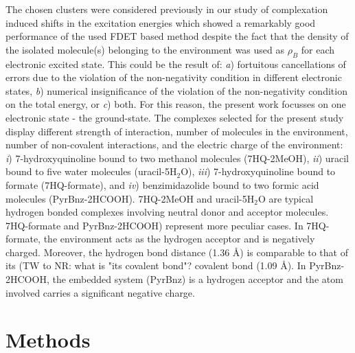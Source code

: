 \documentclass[journal=jctcce,manuscript=article]{achemso}
\begin{document}
The chosen clusters were considered previously in our study of complexation induced shifts in the excitation energies \cite{Ricardi2018} which showed a remarkably good performance of the used FDET based method despite the fact that the density of the isolated molecule(s) belonging to the environment was used as $\rho_B$  for each electronic excited state. This could be the result of: {\it a})  fortuitous cancellations of errors due to the violation of the non-negativity condition in different electronic states, {\it b}) numerical insignificance of the violation of the non-negativity condition on the total energy, or {\it c}) both. 
For this reason, the present work focusses on one electronic state - the ground-state.
The complexes selected for the present study  display different strength of interaction, number of molecules in the environment, number of non-covalent interactions, and the electric charge of the environment:
{\it i})  7-hydroxyquinoline bound to two methanol molecules (7HQ-2MeOH), {\it ii}) uracil bound to five water molecules (uracil-5H$_2$O), {\it iii}) 7-hydroxyquinoline bound to formate (7HQ-formate), and {\it iv}) benzimidazolide bound to two formic acid molecules (PyrBnz-2HCOOH). 
7HQ-2MeOH and  uracil-5H$_2$O are typical hydrogen bonded complexes involving neutral donor and acceptor molecules. 7HQ-formate and PyrBnz-2HCOOH) represent more peculiar cases. In 7HQ-formate, the environment acts as the hydrogen acceptor and is negatively charged. Moreover, the hydrogen bond distance (1.36 \AA) is comparable to that of its ({\color{red}TW to NR: what is "its covalent bond"?} covalent bond (1.09 \AA). 
In PyrBnz-2HCOOH, the embedded system (PyrBnz) is a hydrogen acceptor and the atom involved carries a significant negative charge.



\section{Methods}
\end{document}
